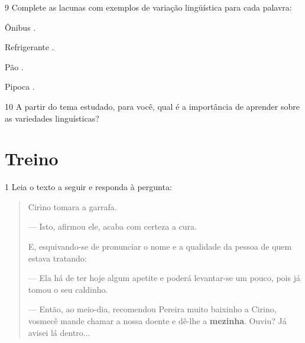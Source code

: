 

\num{9} Complete as lacunas com exemplos de variação lingüística para cada palavra:

\begin{escolha}
\item Ônibus \preencher. 

\item Refrigerante \preencher. 

\item Pão \preencher. 

\item Pipoca \preencher. 
\end{escolha}


\num{10} A partir do tema estudado, para você, qual é a importância de
aprender sobre as variedades linguísticas?



\section{Treino}

\num{1} Leia o texto a seguir e responda à pergunta:

\begin{quote}
Cirino tomara a garrafa.

--- Isto, afirmou ele, acaba com certeza a cura.

E, esquivando-se de pronunciar o nome e a qualidade da pessoa de quem
estava tratando:

--- Ela há de ter hoje algum apetite e poderá levantar-se um pouco, pois
já tomou o seu caldinho.

--- Então, ao meio-dia, recomendou Pereira muito baixinho a Cirino,
vosmecê mande chamar a nossa doente e dê-lhe a \textbf{mezinha}. Ouviu?
Já avisei lá dentro...

\end{quote}


